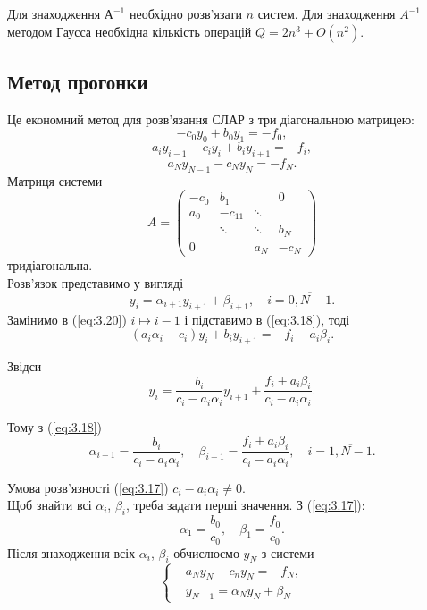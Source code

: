 Для знаходження $А^{-1}$ необхідно розв'язати $n$ систем. Для знаходження $A^{-1}$ методом Гаусса необхідна кількість операцій $Q = 2n^3 + O(n^2)$.

\subsection{Метод прогонки}

Це економний метод для розв'язання СЛАР з три діагональною матрицею:
\begin{equation}
	\label{eq:3.17}
	-c_0 y_0 + b_0 y_1 = - f_0,
\end{equation}
\begin{equation}
	\label{eq:3.18}
	a_i y_{i-1} - c_i y_i + b_i y_{i+1} = -f_i,
\end{equation}
\begin{equation}
	\label{eq:3.19}
	a_N y_{N-1} - c_N y_N = -f_N.
\end{equation}
Матриця системи
\[ A = \begin{pmatrix} -c_0 & b_1 & & 0 \\ a_0 & -c_11 & \ddots & \\ & \ddots & \ddots & b_N \\ 0 & & a_N & -c_N \end{pmatrix}\]
тридіагональна. \\

Розв'язок представимо у вигляді
\begin{equation}
	\label{eq:3.20}
	y_i = \alpha_{i+1} y_{i+1} + \beta_{i+1}, \quad i = \overline{0, N-1}.
\end{equation}
Замінимо в (\ref{eq:3.20}) $i \mapsto i-1$ і підставимо в (\ref{eq:3.18}), тоді \[ (a_i \alpha_i - c_i) y_i + b_i y_{i+1} = - f_i - a_i \beta_i. \]

Звідси \[ y_i = \dfrac{b_i}{c_i - a_i\alpha_i} y_{i+1} + \dfrac{f_i + a_i \beta_i}{c_i - a_i \alpha_i}.\]

Тому з (\ref{eq:3.18}) \[ \alpha_{i+1} = \dfrac{b_i}{c_i - a_i\alpha_i}, \quad \beta_{i+1} = \dfrac{f_i+a_i\beta_i}{c_i-a_i\alpha_i}, \quad i=\overline{1, N-1}.\]

Умова розв'язності (\ref{eq:3.17}) $c_i - a_i \alpha_i \ne 0$. \\

Щоб знайти всі $\alpha_i$, $\beta_i$, треба задати перші значення. З (\ref{eq:3.17}):
\begin{equation}
	\label{eq:3.21}
	\alpha_1 = \dfrac{b_0}{c_0}, \quad \beta_1 = \dfrac{f_0}{c_0}.
\end{equation}
Після знаходження всіх $\alpha_i$, $\beta_i$ обчислюємо $y_N$ з системи
\[ \left\{ \begin{aligned} & a_N y_N - c_n y_N = - f_N, \\ & y_{N-1} = \alpha_N y_N + \beta_N \end{aligned} \right. \]

